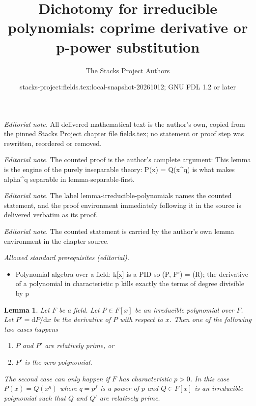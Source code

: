 \documentclass[10pt,a4paper]{amsart}
\title{Dichotomy for irreducible polynomials: coprime derivative or p-power substitution}
\author{The Stacks Project Authors}
\date{stacks-project:fields.tex:local-snapshot-20261012; GNU FDL 1.2 or later}
\theoremstyle{plain}
\newtheorem{lemma}[subsection]{Lemma}
\theoremstyle{definition}
\theoremstyle{remark}
\numberwithin{equation}{subsection}
\begin{document}
\maketitle
\noindent\textit{Editorial note.} All delivered mathematical text is the author's own, copied from the pinned Stacks Project chapter file fields.tex; no statement or proof step was rewritten, reordered or removed.\par\medskip
\noindent\textit{Editorial note.} The counted proof is the author's complete argument: This lemma is the engine of the purely inseparable theory: P(x) = Q(x\textasciicircum{}q) is what makes alpha\textasciicircum{}q separable in lemma-separable-first.\par\medskip
\noindent\textit{Editorial note.} The label lemma-irreducible-polynomials names the counted statement, and the proof environment immediately following it in the source is delivered verbatim as its proof.\par\medskip
\noindent\textit{Editorial note.} The counted statement is carried by the author's own lemma environment in the chapter source.\par\medskip
\noindent\textit{Allowed standard prerequisites (editorial).}\begin{itemize}
\item Polynomial algebra over a field: k[x] is a PID so (P, P') = (R); the derivative of a polynomial in characteristic p kills exactly the terms of degree divisible by p
\end{itemize}\medskip
\begin{lemma}
\label{lemma-irreducible-polynomials}
Let $F$ be a field. Let $P \in F[x]$ be an irreducible polynomial over $F$.
Let $P' = \text{d}P/\text{d}x$ be the derivative of $P$ with respect
to $x$. Then one of the following two cases happens
\begin{enumerate}
\item $P$ and $P'$ are relatively prime, or
\item $P'$ is the zero polynomial.
\end{enumerate}
The second case can only happen if $F$ has characteristic $p > 0$.
In this case $P(x) = Q(x^q)$ where $q = p^f$ is a power of $p$ and
$Q \in F[x]$ is an irreducible polynomial such that $Q$ and $Q'$
are relatively prime.
\end{lemma}
\end{document}
